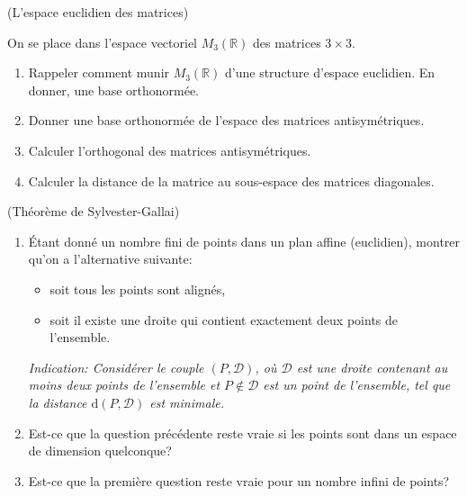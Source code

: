 \documentclass[a4paper,12pt,reqno]{amsart}
\begin{document}
\begin{exo} (L'espace euclidien des matrices)

  On se place dans l'espace vectoriel $M_3(\mathbb{R})$ des matrices $3\times 3$.
  \begin{enumerate}
    \item Rappeler comment munir $M_3(\mathbb{R})$ d'une structure d'espace euclidien. En donner, une base orthonormée.
    \item Donner une base orthonormée de l'espace des matrices antisymétriques.
    \item Calculer l'orthogonal des matrices antisymétriques.
    \item Calculer la distance de la matrice%
      \scalebox{.7}{
        $
          \begin{pmatrix}
            1 & 0 & 0 \\
            1 & 0 & 1 \\
            0 & 0 & 1
          \end{pmatrix}
        $
      }
    au sous-espace des matrices diagonales.
  \end{enumerate}
\end{exo}


\begin{exo} (Théorème de Sylvester-Gallai)
  \begin{enumerate}
    \item Étant donné un nombre fini de points dans un plan affine (euclidien), montrer qu'on a l'alternative suivante:
      \begin{itemize}
        \item soit tous les points sont alignés,
        \item soit il existe une droite qui contient exactement deux points de l'ensemble.
      \end{itemize}
      \emph{Indication: Considérer le couple $(P,\mathcal{D})$, où $\mathcal{D}$ est une droite contenant au moins deux points de l'ensemble et $P\notin \mathcal{D}$ est un point de l'ensemble, tel que la distance $\mathrm{d}(P,\mathcal{D})$ est minimale.}

    \item Est-ce que la question précédente reste vraie si les points sont dans un espace de dimension quelconque?

    \item Est-ce que la première question reste vraie pour un nombre infini de points?
  \end{enumerate}
\end{exo}
\end{document}
